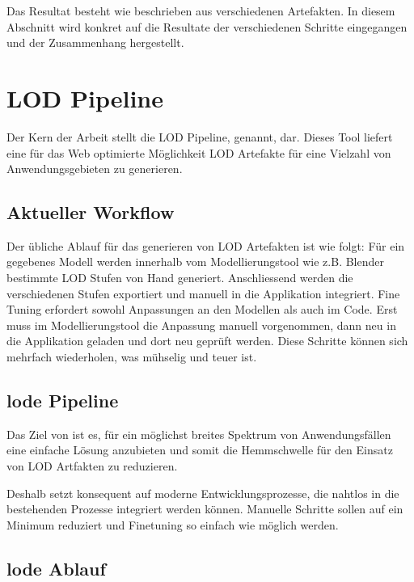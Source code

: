 Das Resultat besteht wie beschrieben aus verschiedenen Artefakten. In diesem Abschnitt wird konkret auf die Resultate der verschiedenen Schritte eingegangen und der Zusammenhang hergestellt.

\section{LOD Pipeline}

Der Kern der Arbeit stellt die LOD Pipeline,  genannt, dar. Dieses Tool liefert eine für das Web optimierte Möglichkeit LOD Artefakte für eine Vielzahl von Anwendungsgebieten zu generieren.

\subsection{Aktueller Workflow}

Der übliche Ablauf für das generieren von LOD Artefakten ist wie folgt:
Für ein gegebenes Modell werden innerhalb vom Modellierungstool wie z.B. Blender bestimmte LOD Stufen von Hand generiert. Anschliessend werden die verschiedenen Stufen exportiert und manuell in die Applikation integriert. Fine Tuning erfordert sowohl Anpassungen an den Modellen als auch im Code. Erst muss im Modellierungstool die Anpassung manuell vorgenommen, dann neu in die Applikation geladen und dort neu geprüft werden. Diese Schritte können sich mehrfach wiederholen, was mühselig und teuer ist.

\subsection{lode Pipeline}

Das Ziel von  ist es, für ein möglichst breites Spektrum von Anwendungsfällen eine einfache Lösung anzubieten und somit die Hemmschwelle für den Einsatz von LOD Artfakten zu reduzieren.

Deshalb setzt  konsequent auf moderne Entwicklungsprozesse, die nahtlos in die bestehenden Prozesse integriert werden können. Manuelle Schritte sollen auf ein Minimum reduziert und Finetuning so einfach wie möglich werden.

\subsection{lode Ablauf}

